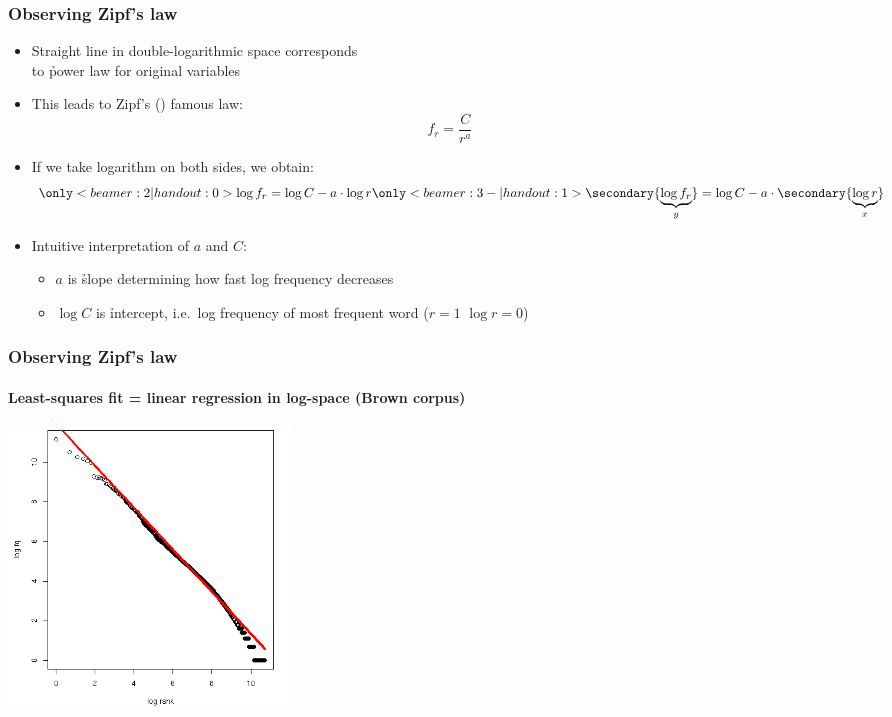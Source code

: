 \documentclass[t]{beamer} %
\begin{document}
\begin{frame}
  \frametitle{Observing Zipf's law}

  \begin{itemize}
  \item Straight line in double-logarithmic space corresponds\\
    to \h{power law} for original variables
  \item This leads to Zipf's (\citeyear{Zipf:49,Zipf:65}) famous law:
    \[
      f_r = \frac{C}{r^a}
    \]
  \item<2-> If we take logarithm on both sides, we obtain:
    \[
    \only<beamer:2| handout:0>{%
      \log f_r = \log C - a \cdot \log r}%
    \only<beamer:3-| handout:1>{%
      \secondary{\underbrace{\log f_r}_y}
      = \log C - a \cdot \secondary{\underbrace{\log r}_x}}%
    \]
  \item<4-> Intuitive interpretation of $a$ and $C$:
    \begin{itemize}
    \item $a$ is \h{slope} determining how fast log frequency decreases
    \item $\log C$ is \h{intercept}, i.e.\ log frequency of most frequent word
      ($r = 1$ \so $\log r = 0$) 
    \end{itemize}
  \end{itemize}

\end{frame}

\begin{frame}
  \frametitle{Observing Zipf's law}
  \framesubtitle{Least-squares fit = linear regression in log-space (Brown corpus)}

  \ungap[1.5]
  \begin{center}
    \includegraphics[height=7.5cm]{img/brown-zipf-rf}
  \end{center}
\end{frame}
\end{document}
